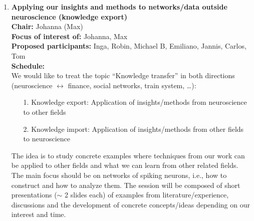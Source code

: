 \documentclass[10pt, a4paper,twoside,american]{article}
\newcommand{\alert}[1]{\textcolor{red}{\bf #1}}
\begin{document}
\begin{enumerate}[resume]
  {\bf Chair:} Rembrandt (Sacha)\\[1ex]
  {\bf Focus of interest of:} Rembrandt, Sacha, (Renato)\\[1ex]
  {\bf Proposed participants:} Sacha, Julia, Lukas, Hannah, Rembrandt, Markus, Fred, (Nicole)\\[1ex]
  {\bf Schedule:} \alert{TBA}\\[1ex]
  Notes:
  \begin{itemize}
  \item folding patterns of ferret cortex in developing brains
  \item features of new connectivity matrix of macaque visual cortex
  \end{itemize}
\item {\large\bf Applying our insights and methods to networks/data outside neuroscience (knowledge export)}\\[1ex]
  {\bf Chair:} Johanna (Max)\\[1ex]
  {\bf Focus of interest of:} Johanna, Max\\[1ex]
  {\bf Proposed participants:} Inga, Robin, Michael B, Emiliano, Jannis, Carlos, Tom\\[1ex]
  {\bf Schedule:}\\[1ex]
  We would like to treat the topic ``Knowledge transfer'' in both directions (neuroscience $\leftrightarrow$ finance, social networks, train system, \ldots):
  \begin{itemize}
  \item[1.] Knowledge export: Application of insights/methods from
    neuroscience to other fields
  \item[2.] Knowledge import: Application of insights/methods from
    other fields to neuroscience
  \end{itemize}
  The idea is to study concrete examples where techniques from our
  work can be applied to other fields and what we can learn from other
  related fields. The main focus should be on networks of spiking
  neurons, i.e., how to construct and how to analyze them.  The
  session will be composed of short presentations ($\sim$ 2 slides each) of examples from
  literature/experience, discussions and the development of concrete
  concepts/ideas depending on our interest and time.
\end{enumerate}
\end{document}
